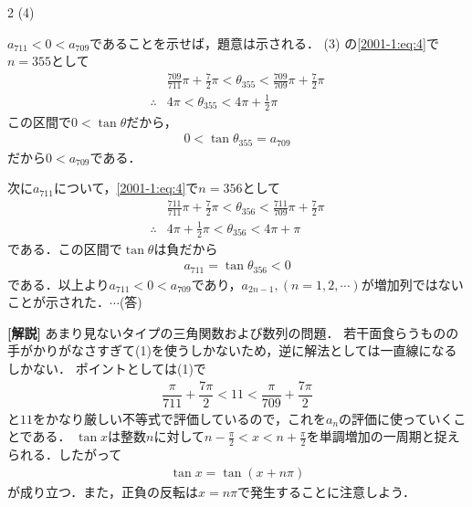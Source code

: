 \documentclass[../../main.tex]{subfiles}
\begin{document}
\begin{multicols}{2}
  \vspace{10pt}
  (4)

  $a_{711}<0<a_{709}$であることを示せば，題意は示される．
  (3) の\cref{2001-1:eq:4}で$n=355$として
  \begin{align*}
     & \frac{709}{711}\pi + \frac{7}{2}\pi < \theta_{355} < \frac{709}{709}\pi + \frac{7}{2}\pi \\
    \therefore
     & 4\pi < \theta_{355} < 4\pi + \frac{1}{2}\pi
  \end{align*}
  この区間で$0<\tan\theta$だから，
  \begin{align*}
    0 < \tan\theta_{355} = a_{709}
  \end{align*}
  だから$0<a_{709}$である．

  次に$a_{711}$について，\cref{2001-1:eq:4}で$n=356$として
  \begin{align*}
     & \frac{711}{711}\pi + \frac{7}{2}\pi < \theta_{356} < \frac{711}{709}\pi + \frac{7}{2}\pi \\
    \therefore
     & 4\pi + \frac{1}{2}\pi < \theta_{356} < 4\pi + \pi
  \end{align*}
  である．この区間で$\tan\theta$は負だから
  \begin{align*}
    a_{711} = \tan\theta_{356} < 0
  \end{align*}
  である．以上より$a_{711}<0<a_{709}$であり，$a_{2n-1}, (n=1,2,\cdots)$が増加列ではないことが示された．$\cdots$(答)

  \vspace{10pt}
  {\bf[解説]}
  あまり見ないタイプの三角関数および数列の問題．
  若干面食らうものの手がかりがなさすぎて(1)を使うしかないため，逆に解法としては一直線になるしかない．
  ポイントとしては(1)で
  \begin{align*}
    \dfrac{\pi}{711} + \dfrac{7\pi}{2} < 11 < \dfrac{\pi}{709} + \dfrac{7\pi}{2}
  \end{align*}
  と$11$をかなり厳しい不等式で評価しているので，これを$a_n$の評価に使っていくことである．
  $\tan x$は整数$n$に対して$n-\frac{\pi}{2}<x<n+\frac{\pi}{2}$を単調増加の一周期と捉えられる．したがって
  \begin{align*}
    \tan x = \tan (x+n\pi)
  \end{align*}
  が成り立つ．また，正負の反転は$x=n\pi$で発生することに注意しよう．


\end{multicols}
\end{document}
